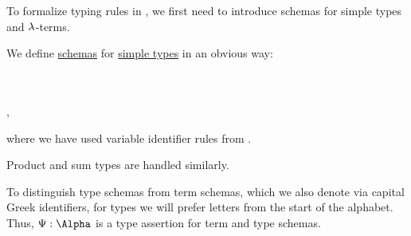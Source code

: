 To formalize typing rules in , we first need to introduce schemas for simple types and \( \mathrm{\lambda} \)-terms.

\begin{definition}\label{def:simple_type_schema}
  We define \hyperref[con:schemas_and_instances]{schemas} for \hyperref[def:simple_type]{simple types} in an obvious way:
  \begin{bnf*}
        {} \\
       {\bnftsq{(} \bnfsp {} \bnfsp \bnftsq{\( \synimplies \)} \bnfsp {} \bnfsp \bnftsq{)}} \\
             { \bnfor {} \bnfor {}},
  \end{bnf*}
  where we have used variable identifier rules from .

  Product and sum types are handled similarly.
\end{definition}
\begin{comments}
  \item To distinguish type schemas from term schemas, which we also denote via capital Greek identifiers, for types we will prefer letters from the start of the alphabet. Thus, \( \Psi: \Alpha \) is a type assertion for term and type schemas.
\end{comments}

